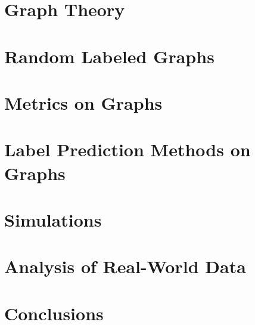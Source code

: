 \documentclass[11pt,oneside]{report}
\theoremstyle{definition}
\begin{document}
\chapter{Graph Theory}
\label{chap:graph_theory}



\chapter{Random Labeled Graphs}
\label{chap:random_graphs}



\chapter{Metrics on Graphs}
\label{chap:metrics}



\chapter{Label Prediction Methods on Graphs}
\label{chap:prediction}



\chapter{Simulations}
\label{chap:simulations}



\chapter{Analysis of Real-World Data}
\label{chap:real_world}



\chapter{Conclusions}
\label{chap:conclusions}





\end{document}
